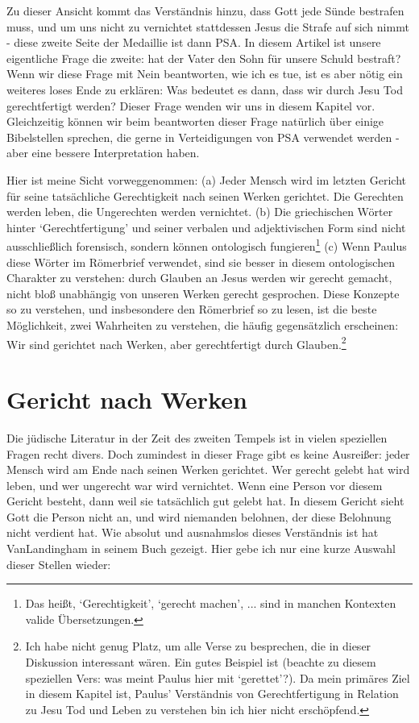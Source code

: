 Zu dieser Ansicht kommt das Verständnis hinzu, dass Gott jede Sünde bestrafen muss, und um uns nicht zu vernichtet stattdessen Jesus die Strafe auf sich nimmt
- diese zweite Seite der Medaillie ist dann PSA.
In diesem Artikel ist unsere eigentliche Frage die zweite: hat der Vater den Sohn für unsere Schuld bestraft?
Wenn wir diese Frage mit Nein beantworten, wie ich es tue, ist es aber nötig ein weiteres loses Ende zu erklären:
Was bedeutet es dann, dass wir durch Jesu Tod gerechtfertigt werden?
Dieser Frage wenden wir uns in diesem Kapitel vor. Gleichzeitig können wir beim beantworten dieser Frage
natürlich über einige Bibelstellen sprechen, die gerne in Verteidigungen von PSA verwendet werden - aber eine bessere Interpretation haben.

Hier ist meine Sicht vorweggenommen:
(a) Jeder Mensch wird im letzten Gericht für seine tatsächliche Gerechtigkeit nach seinen Werken gerichtet.
Die Gerechten werden leben, die Ungerechten werden vernichtet.
(b) Die griechischen Wörter hinter `Gerechtfertigung' und seiner verbalen und adjektivischen Form sind nicht ausschließlich forensisch, sondern
können ontologisch fungieren\footnote{
	Das heißt, `Gerechtigkeit', `gerecht machen', ... sind in manchen Kontexten valide Übersetzungen.
}
(c) Wenn Paulus diese Wörter im Römerbrief verwendet, sind sie besser in diesem ontologischen Charakter zu verstehen:
durch Glauben an Jesus werden wir gerecht gemacht, nicht bloß unabhängig von unseren Werken gerecht gesprochen.
Diese Konzepte so zu verstehen, und insbesondere den Römerbrief so zu lesen, ist die beste Möglichkeit, zwei Wahrheiten zu verstehen, die
häufig gegensätzlich erscheinen: Wir sind gerichtet nach Werken, aber gerechtfertigt durch Glauben.\footnote{
	Ich habe nicht genug Platz, um alle Verse zu besprechen, die in dieser Diskussion interessant wären.
	Ein gutes Beispiel ist  (beachte zu diesem speziellen Vers: was meint Paulus hier mit `gerettet'?).
	Da mein primäres Ziel in diesem Kapitel ist, Paulus' Verständnis von Gerechtfertigung in Relation zu Jesu Tod und Leben zu verstehen
	bin ich hier nicht erschöpfend.
}

\section{\label{sec:gericht-nach-werken}Gericht nach Werken}
Die jüdische Literatur in der Zeit des zweiten Tempels ist in vielen speziellen Fragen recht divers.
Doch zumindest in dieser Frage gibt es keine Ausreißer: jeder Mensch wird am Ende nach seinen Werken gerichtet.
Wer gerecht gelebt hat wird leben, und wer ungerecht war wird vernichtet.
Wenn eine Person vor diesem Gericht besteht, dann weil sie tatsächlich gut gelebt hat.
In diesem Gericht sieht Gott die Person nicht an, und wird niemanden belohnen, der diese Belohnung nicht verdient hat.
Wie absolut und ausnahmslos dieses Verständnis ist hat VanLandingham in seinem Buch \Cite{judgement-and-justification-in-early-judaism-and-the-apostle-paul} gezeigt.
Hier gebe ich nur eine kurze Auswahl dieser Stellen wieder:

